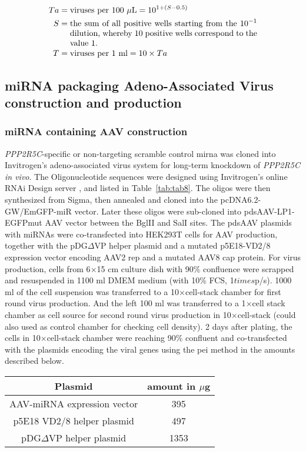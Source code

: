 \begin{align*}
Ta & = \text{viruses per 100 $\mu$L}  = 10^{1 + (S - 0.5)}\\
S &  = \text{\parbox[t]{8 cm}{the sum of all positive wells starting from the $10^{-1}$ dilution, whereby 10 positive wells correspond to the value 1.}}  \\
T &  = \text{viruses per 1 ml}  = 10 \times Ta
\end{align*}

\subsection{miRNA packaging Adeno-Associated Virus construction and production}

\subsubsection{miRNA containing AAV construction}
\textit{PPP2R5C}-specific or non-targeting scramble control \gls{mirna} was cloned into Invitrogen's adeno-associated virus system for long-term knockdown of \textit{PPP2R5C} \textit{in vivo}. The Oligonucleotide sequences were designed using Invitrogen’s online RNAi Design server \cite{_invitrogen_2014}, and listed in Table~\ref{tab:tab8}. The oligos were then synthesized from Sigma, then annealed and cloned into the pcDNA6.2-GW{\slash}EmGFP-miR vector. Later these oligos were sub-cloned into pdsAAV-LP1-EGFPmut \gls{AAV} vector \cite{kulozik_hepatic_2011} between the BglII and SalI sites. The pdsAAV plasmids with miRNAs were co-transfected into HEK293T cells for AAV production, together with the pDG$\Delta$VP helper plasmid \cite{grimm_novel_1998} and a mutated p5E18-VD2/8 expression vector \cite{gao_novel_2002} encoding AAV2 rep and a mutated AAV8 cap protein. For virus production, cells from 6$\times$15 cm culture dish with 90\% confluence were scrapped and resuspended in 1100 ml DMEM medium (with 10\% FCS, 1$times$\gls{p/s}). 1000 ml of the cell suspension was transferred to a 10$\times$cell-stack chamber for first round virus production. And the left 100 ml was transferred to a 1$\times$cell stack chamber as cell source for second round virus production in 10$\times$cell-stack (could also used as control chamber for checking cell density). 2 days after plating, the cells in 10$\times$cell-stack chamber were reaching 90\% confluent and co-transfected with the plasmids encoding the viral genes using the \gls{pei} method in the amounts described below. 
\begin{center}
	\begin{tabular}{c c}
	Plasmid                   & amount in $\mu$g\\
	\hline
	AAV-miRNA expression vector          & 395\\
	p5E18 VD2/8 helper plasmid  & 497\\
	pDG$\Delta$VP helper plasmid               & 1353\\
	\end{tabular}\\
\end{center}

